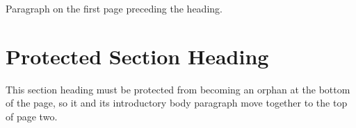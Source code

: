 \documentclass{article}
\begin{document}
Paragraph on the first page preceding the heading.

\vspace{640pt}

\section{Protected Section Heading}
This section heading must be protected from becoming an orphan at the bottom of the page, so it and its introductory body paragraph move together to the top of page two.
\end{document}
